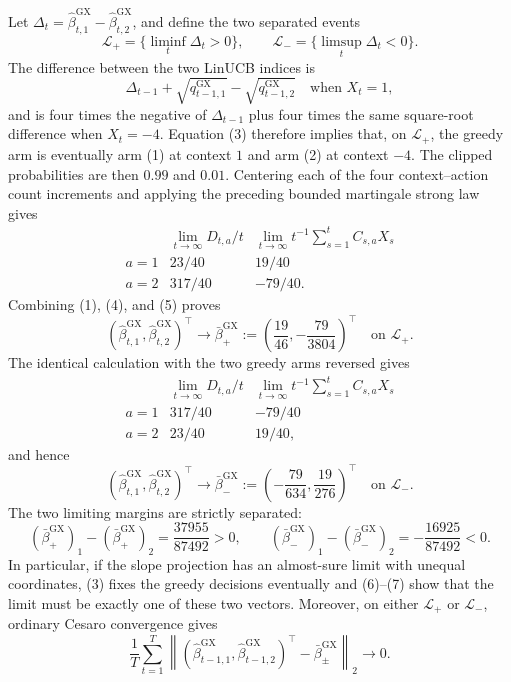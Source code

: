Let
\(\Delta_t=\widehat\beta^{\mathrm{GX}}_{t,1}-
\widehat\beta^{\mathrm{GX}}_{t,2}\), and define the two separated events
\[
 \mathcal L_+=\{\liminf_t\Delta_t>0\},
 \qquad
 \mathcal L_-=\{\limsup_t\Delta_t<0\}.
\]
The difference between the two LinUCB indices is
\[
 \Delta_{t-1}+\sqrt{q^{\mathrm{GX}}_{t-1,1}}
             -\sqrt{q^{\mathrm{GX}}_{t-1,2}}
 \quad\text{when }X_t=1,
\]
and is four times the negative of \(\Delta_{t-1}\) plus four times the same
square-root difference when \(X_t=-4\).  Equation (3) therefore implies
that, on \(\mathcal L_+\), the greedy arm is eventually arm (1) at context
\(1\) and arm (2) at context \(-4\).  The clipped probabilities are then
\(0.99\) and \(0.01\).  Centering each of the four context--action count
increments and applying the preceding bounded martingale strong law gives
\[
 \begin{array}{c|cc}
 &\displaystyle\lim_{t\to\infty}D_{t,a}/t
 &\displaystyle\lim_{t\to\infty}t^{-1}\sum_{s=1}^tC_{s,a}X_s\\[2mm]\hline
 a=1&23/40&19/40\\
 a=2&317/40&-79/40.
 \end{array}
 \tag{5}
\]
Combining (1), (4), and (5) proves
\[
 \left(\widehat\beta^{\mathrm{GX}}_{t,1},
       \widehat\beta^{\mathrm{GX}}_{t,2}\right)^\top
 \longrightarrow
 \bar\beta^{\mathrm{GX}}_+
 :=\left(\frac{19}{46},-\frac{79}{3804}\right)^\top
 \quad\text{on }\mathcal L_+.
 \tag{6}
\]
The identical calculation with the two greedy arms reversed gives
\[
 \begin{array}{c|cc}
 &\displaystyle\lim_{t\to\infty}D_{t,a}/t
 &\displaystyle\lim_{t\to\infty}t^{-1}\sum_{s=1}^tC_{s,a}X_s\\[2mm]\hline
 a=1&317/40&-79/40\\
 a=2&23/40&19/40,
 \end{array}
\]
and hence
\[
 \left(\widehat\beta^{\mathrm{GX}}_{t,1},
       \widehat\beta^{\mathrm{GX}}_{t,2}\right)^\top
 \longrightarrow
 \bar\beta^{\mathrm{GX}}_-
 :=\left(-\frac{79}{634},\frac{19}{276}\right)^\top
 \quad\text{on }\mathcal L_-.
 \tag{7}
\]
The two limiting margins are strictly separated:
\[
 (\bar\beta^{\mathrm{GX}}_+)_1-(\bar\beta^{\mathrm{GX}}_+)_2
 =\frac{37955}{87492}>0,
 \qquad
 (\bar\beta^{\mathrm{GX}}_-)_1-(\bar\beta^{\mathrm{GX}}_-)_2
 =-\frac{16925}{87492}<0.
 \tag{8}
\]
In particular, if the slope projection has an almost-sure limit with unequal
coordinates, (3) fixes the greedy decisions eventually and (6)--(7) show
that the limit must be exactly one of these two vectors.  Moreover, on either
\(\mathcal L_+\) or \(\mathcal L_-\), ordinary Cesaro convergence gives
\[
 \frac1T\sum_{t=1}^T
 \left\|
 (\widehat\beta^{\mathrm{GX}}_{t-1,1},
  \widehat\beta^{\mathrm{GX}}_{t-1,2})^\top
 -\bar\beta^{\mathrm{GX}}_{\pm}
 \right\|_2\longrightarrow0.
 \tag{9}
\]

